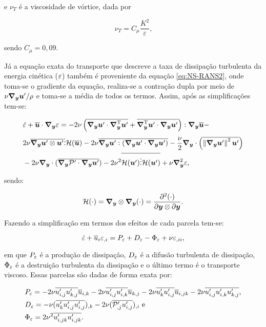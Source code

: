 \noindent e $\nu_T$ é a viscosidade de vórtice, dada por

\begin{equation}
    \nu_T=C_\mu\frac{K^2}{\varepsilon}\text{,}
\end{equation}

\noindent sendo $C_\mu=0,09$.

Já a equação exata do transporte que descreve a taxa de dissipação turbulenta da energia cinética ($\varepsilon$) também é proveniente da equação \eqref{eq:NS-RANS2}, onde toma-se o gradiente da equação, realiza-se a contração dupla por meio de $\nu\boldsymbol{\nabla_y}\boldsymbol{u}'/\rho$ e toma-se a média de todos os termos. Assim, após as simplificações tem-se:

\begin{equation}
    \begin{split}
        &\dot{\varepsilon}+\overline{\boldsymbol{u}}\cdot\boldsymbol{\nabla_y}\varepsilon=-2\nu\left({\overline{\boldsymbol{\nabla_y}\boldsymbol{u}'\cdot\boldsymbol{\nabla}^{\mathrm{T}}_{\boldsymbol{y}}\boldsymbol{u}'}+\overline{\boldsymbol{\nabla}^{\mathrm{T}}_{\boldsymbol{y}}\boldsymbol{u}'\cdot\boldsymbol{\nabla_y}\boldsymbol{u}'}}\right):\boldsymbol{\nabla_y}\overline{\boldsymbol{u}}-\\
        &2\nu\overline{\boldsymbol{\nabla_y}\boldsymbol{u}'\otimes\boldsymbol{u}'}\vdots\mathcal{H}{(\overline{\boldsymbol{u}})}-2\nu\overline{\boldsymbol{\nabla_y}\boldsymbol{u}':(\boldsymbol{\nabla_y}\boldsymbol{u}'\cdot\boldsymbol{\nabla_y}\boldsymbol{u}')}-\frac{\nu}{2}\boldsymbol{\nabla_y}\cdot\left({\overline{\left\lVert{\boldsymbol{\nabla_y}\boldsymbol{u}'}\right\lVert^2\boldsymbol{u}'}}\right)\\
        &-2\nu\boldsymbol{\nabla_y}\cdot(\overline{\boldsymbol{\nabla_y}\mathcal{P}'\cdot\boldsymbol{\nabla_y}\boldsymbol{u}'})-2\nu^2\overline{\mathcal{H}(\boldsymbol{u}')\vdots\mathcal{H}(\boldsymbol{u}')}+\nu\boldsymbol{\nabla}^2_{\boldsymbol{y}}\varepsilon\text{,}
    \end{split}
\end{equation}

\noindent sendo:

\begin{equation}
    \mathcal{H}(\cdot)=\boldsymbol{\nabla_y}\otimes\boldsymbol{\nabla_y}(\cdot)=\frac{\partial^2(\cdot)}{\partial\boldsymbol{y}\otimes\partial\boldsymbol{y}}\text{.}
\end{equation}

Fazendo a simplificação em termos dos efeitos de cada parcela tem-se:

\begin{equation}
    \dot{\varepsilon}+\overline{u}_i\varepsilon_{,i}=P_\varepsilon+D_\varepsilon-\Phi_\varepsilon+\nu\varepsilon_{,ii}\text{,}
\end{equation}

\noindent em que $P_\varepsilon$ é a produção de dissipação, $D_\varepsilon$ é a difusão turbulenta de dissipação, $\Phi_\varepsilon$ é a destruição turbulenta da dissipação e o último termo é o transporte viscoso. Essas parcelas são dadas de forma exata por:

\begin{subequations}
    \begin{align}
         & P_\varepsilon=-2\nu\overline{u'_{i,j}u'_{k,j}}\overline{u}_{i,k}-2\nu\overline{u'_{i,j}u'_{i,k}}\overline{u}_{k,j}-2\nu\overline{u'_ku'_{i,j}}\overline{u}_{i,jk}-2\nu\overline{u'_{i,j}u'_{i,k}u'_{k,j}} \text{,} \\
         & D_\varepsilon=-\nu(\overline{u'_ku'_{i,j}u'_{i,j}})_{,k}-2\nu(\overline{\mathcal{P}'_{,j}u'_{i,j}})_{,i} \text{ e}                                                                                \\
         & \Phi_\varepsilon=2\nu^2\overline{u'_{i,jk}u'_{i,jk}}\text{.}
    \end{align}
\end{subequations}

